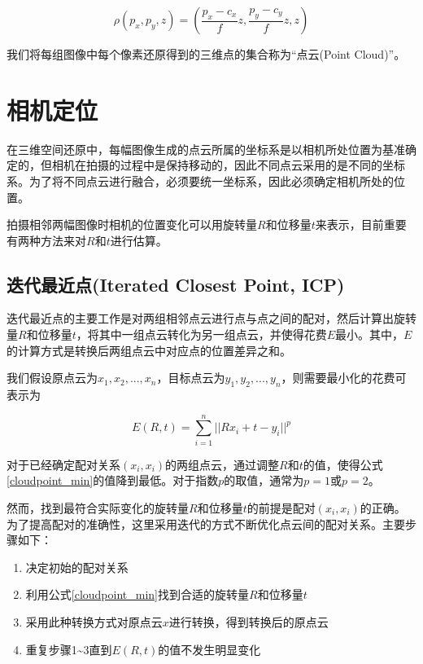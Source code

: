 \documentclass{llncs}
\begin{document}
\begin{CJK}{UTF8}{song}
\begin{equation}
	\rho(p_x,p_y,z) = (\frac{p_x-c_x}{f}z,\frac{p_y-c_y}{f}z,z)
\end{equation}

我们将每组图像中每个像素还原得到的三维点的集合称为“点云(Point Cloud)”。

\section{相机定位}
在三维空间还原中，每幅图像生成的点云所属的坐标系是以相机所处位置为基准确定的，但相机在拍摄的过程中是保持移动的，因此不同点云采用的是不同的坐标系。为了将不同点云进行融合，必须要统一坐标系，因此必须确定相机所处的位置。

拍摄相邻两幅图像时相机的位置变化可以用旋转量$R$和位移量$t$来表示，目前重要有两种方法来对$R$和$t$进行估算。

	\subsection{迭代最近点(Iterated Closest Point, ICP)}

迭代最近点的主要工作是对两组相邻点云进行点与点之间的配对，然后计算出旋转量$R$和位移量$t$，将其中一组点云转化为另一组点云，并使得花费$E$最小\cite{DBLP:journals/pami/BeslM92}。其中，$E$的计算方式是转换后两组点云中对应点的位置差异之和。

我们假设原点云为$x_1,x_2,...,x_n$，目标点云为$y_1,y_2,...,y_n$，则需要最小化的花费可表示为

\begin{equation}
\label{cloudpoint_min}
	E(R,t) = \sum_{i=1}^n||Rx_i+t-y_i||^p
\end{equation}

对于已经确定配对关系$(x_i,x_i)$的两组点云，通过调整$R$和$t$的值，使得公式\ref{cloudpoint_min}的值降到最低。对于指数$p$的取值，通常为$p=1$或$p=2$。

然而，找到最符合实际变化的旋转量$R$和位移量$t$的前提是配对$(x_i,x_i)$的正确。为了提高配对的准确性，这里采用迭代的方式不断优化点云间的配对关系。主要步骤如下：

\begin{enumerate}
\item{决定初始的配对关系}
\item{利用公式\ref{cloudpoint_min}找到合适的旋转量$R$和位移量$t$}
\item{采用此种转换方式对原点云$x$进行转换，得到转换后的原点云}
\item{重复步骤1\~{}3直到$E(R,t)$的值不发生明显变化}
\end{enumerate}


\end{CJK}
\end{document}
